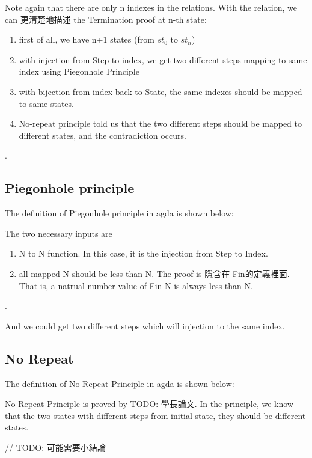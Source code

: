 Note again that there are only n indexes in the relations.
With the relation, we can 更清楚地描述 the Termination proof at n-th state:
\begin{enumerate}[1.]
    \item first of all, we have n+1 states (from $st_{0}$ to $st_{n}$)
    \item with injection from Step to index, we get two different steps mapping to same index using Piegonhole Principle
    \item with bijection from index back to State, the same indexes should be mapped to same states.
    \item No-repeat principle told us that the two different steps should be mapped to different states, and the contradiction occurs.
\end{enumerate}.

\subsection{ Piegonhole principle }
The definition of Piegonhole principle in agda is shown below:



The two necessary inputs are 
\begin{enumerate}[1.]
    \item N to N function. In this case, it is the injection from Step to Index. 
    \item all mapped N should be less than N.  The proof is 隱含在 Fin的定義裡面.  That is, a natrual number value of Fin N is always less than N.
\end{enumerate}.

And we could get two different steps which will injection to the same index.

\subsection{ No Repeat }
The definition of No-Repeat-Principle in agda is shown below:

No-Repeat-Principle is proved by {TODO: 學長論文}.  In the principle, we know that the two states with different steps from initial state, they should be different states.


// TODO: 可能需要小結論

